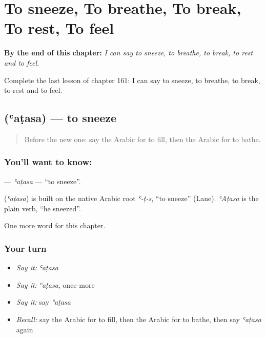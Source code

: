 
\chapter{To sneeze, To breathe, To break, To rest, To feel}
\label{ch:ar-to-sneeze-to-breathe-to-break-to-rest-to-feel}

\begin{chapteropening}
\textbf{By the end of this chapter:} \emph{I can say to sneeze, to breathe, to break, to rest and to feel.}

Complete the last lesson of chapter 161: I can say to sneeze, to breathe, to break, to rest and to feel.
\end{chapteropening}

\section[\texorpdfstring{\ar{عطس} (ʿaṭasa)}{عطس (ʿaṭasa)}]{ (ʿaṭasa) — to sneeze}

\label{lesson:AR-C161-atasa}



\begin{quote}
Before the new one: say the Arabic for to fill, then the Arabic for to bathe.
\end{quote}

\subsection*{You'll want to know: }
\textbf{} — \emph{ʿaṭasa} — \textquotedblleft{}to sneeze\textquotedblright{}.

\begin{cousinweb}
\textbf{} (\emph{ʿaṭasa}) is built on the native Arabic root \emph{ʿ-ṭ-s}, \textquotedblleft{}to sneeze\textquotedblright{} (Lane). \emph{ʿAṭasa} is the plain verb, \textquotedblleft{}he sneezed\textquotedblright{}.
\end{cousinweb}

\begin{grammarlens}[title={What you've built}]
One more word for this chapter.
\end{grammarlens}

\subsection*{Your turn}
\begin{itemize}
\raggedright
  \item \emph{Say it:} \emph{ʿaṭasa}
  \item \emph{Say it:} \emph{ʿaṭasa}, once more
  \item \emph{Say it:} say \emph{ʿaṭasa}
  \item \emph{Recall:} say the Arabic for to fill, then the Arabic for to bathe, then say \emph{ʿaṭasa} again
\end{itemize}

